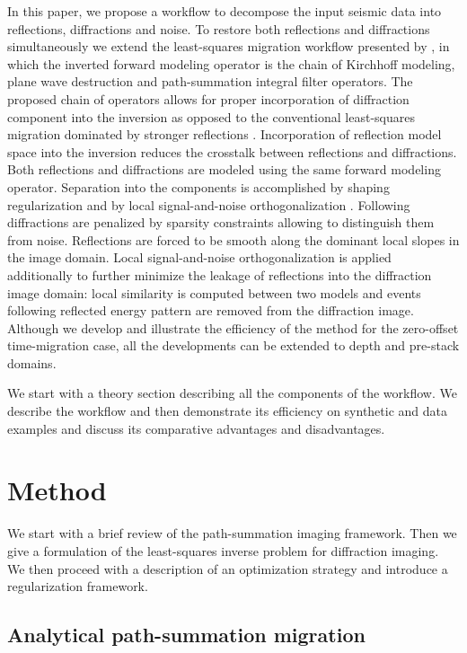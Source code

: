In this paper, we propose a workflow to decompose the input seismic data into reflections, diffractions and noise.
To restore both reflections and diffractions simultaneously
we extend the least-squares migration workflow presented by \cite{merzlikin2016least}, in which the inverted forward modeling operator is the chain of
Kirchhoff modeling, plane wave destruction and path-summation integral filter operators.
The proposed chain of operators allows for proper incorporation of diffraction component into the inversion as opposed
to the conventional least-squares migration dominated by
stronger reflections \cite[]{merzlikin2016least}.
Incorporation of reflection model space into the inversion reduces the crosstalk between reflections and diffractions. Both reflections
and diffractions are modeled using the same forward modeling operator.
Separation into the components is accomplished by shaping regularization
\cite[]{fomel2007shaping,fomel2008nonlinear} and by local signal-and-noise orthogonalization
\cite[]{chen2015random}. Following \cite{merzlikin2016least} diffractions are penalized by sparsity constraints allowing to distinguish them from noise. Reflections
are forced to be smooth along the dominant local slopes in the image domain. Local signal-and-noise orthogonalization is
applied additionally to further minimize the leakage of reflections
into the diffraction image domain: local similarity \cite[]{fomel2007local} is computed between two models and events following reflected energy pattern are removed from the diffraction image. 
Although we develop and illustrate the efficiency of the method for the zero-offset time-migration case, all the developments
can be extended to depth and pre-stack domains.

We start with a theory section describing all the components of the workflow. We describe the
workflow and then demonstrate its efficiency on synthetic and data examples and discuss its comparative advantages and
disadvantages. 

\section{Method}

We start with a brief review of the path-summation imaging framework.
Then we give a formulation of the least-squares inverse problem for diffraction imaging. We then proceed with a description
of an optimization strategy and introduce a regularization framework.

\subsection{Analytical path-summation migration}

